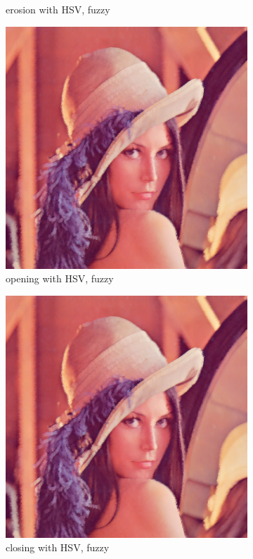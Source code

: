 \begin{figure}[!ht]
\begin{subfigure}[t]{0.22\textwidth}
    \caption{erosion with HSV, fuzzy}
    \centering
  \end{subfigure}
\begin{subfigure}[t]{0.22\textwidth}
    \includegraphics[width=0.9\linewidth]{../project/images/outputs/compare_order/opening_HSV_fuzzy.png}
    \caption{opening with HSV, fuzzy}
    \centering
  \end{subfigure}
\begin{subfigure}[t]{0.22\textwidth}
    \includegraphics[width=0.9\linewidth]{../project/images/outputs/compare_order/closing_HSV_fuzzy.png}
    \caption{closing with HSV, fuzzy}
    \centering
  \end{subfigure}
 \caption{}
 \end{figure}
